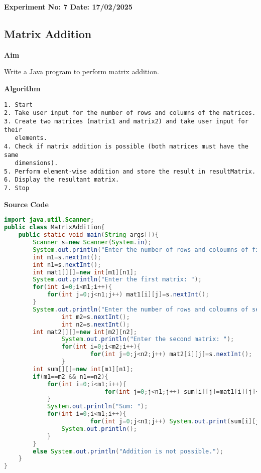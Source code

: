 \textbf{Experiment No: 7 \hfill Date: 17/02/2025}

\begin{center}
    \Large \subsection*{Matrix Addition}
\end{center}

\textbf{Aim}
\vspace{0.5cm}

Write a Java program to perform matrix addition.

\vspace{0.5cm}
\textbf{Algorithm}
\vspace{0.5cm}
\begin{verbatim}
1. Start
2. Take user input for the number of rows and columns of the matrices.
3. Create two matrices (matrix1 and matrix2) and take user input for their 
   elements.
4. Check if matrix addition is possible (both matrices must have the same 
   dimensions).
5. Perform element-wise addition and store the result in resultMatrix.
6. Display the resultant matrix.
7. Stop
\end{verbatim}

\vspace{0.5cm}
\textbf{Source Code}
\begin{lstlisting}[language=Java]
import java.util.Scanner;
public class MatrixAddition{
	public static void main(String args[]){
		Scanner s=new Scanner(System.in);
		System.out.println("Enter the number of rows and coloumns of first matrix: ");
		int m1=s.nextInt();
		int n1=s.nextInt();
		int mat1[][]=new int[m1][n1];
		System.out.println("Enter the first matrix: ");
		for(int i=0;i<m1;i++){
			for(int j=0;j<n1;j++) mat1[i][j]=s.nextInt();
		}
		System.out.println("Enter the number of rows and coloumns of second matrix: ");
                int m2=s.nextInt();
                int n2=s.nextInt();
		int mat2[][]=new int[m2][n2];
                System.out.println("Enter the second matrix: ");
                for(int i=0;i<m2;i++){
                        for(int j=0;j<n2;j++) mat2[i][j]=s.nextInt();
                }
		int sum[][]=new int[m1][n1];
		if(m1==m2 && n1==n2){
			for(int i=0;i<m1;i++){
                        	for(int j=0;j<n1;j++) sum[i][j]=mat1[i][j]+mat2[i][j];
			}
			System.out.println("Sum: ");
			for(int i=0;i<m1;i++){
                		for(int j=0;j<n1;j++) System.out.print(sum[i][j]+"\t");
				System.out.println();
			}
		}
		else System.out.println("Addition is not possible.");
	}
}
\end{lstlisting}


